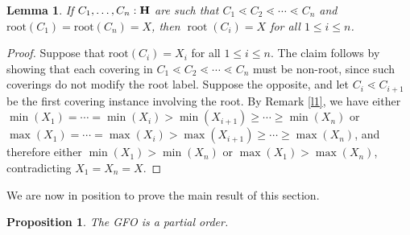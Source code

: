 \documentclass{article}
\theoremstyle{plain}
\newtheorem{lemma}[thm]{Lemma}
\newtheorem{prop}[thm]{Proposition}
\theoremstyle{definition}
\begin{document}
\begin{lemma}\label{l2}
If $C_1,\dots,C_n:{\bf H}$ are such that $C_1 \lessdot C_2 \lessdot \cdots \lessdot C_n$ and $\textrm{root}(C_1)=\textrm{root}(C_n)=X$,
 then $\operatorname{root}(C_i)=X$ for all $1\leq i\leq n$.
\end{lemma}
\begin{proof}
Suppose that $\textrm{root}(C_i)=X_i$ for all $1\leq i\leq n$. The claim follows by showing that each covering in $C_1 \lessdot C_2 \lessdot \cdots \lessdot C_n$ must be non-root, since such coverings do not modify the root label. Suppose the opposite, and let $C_i\lessdot C_{i+1}$ be the first covering instance involving the root. By Remark \ref{l1}, we have either $\min(X_1)=\cdots =\min(X_i)>\min(X_{i+1})\geq \cdots\geq\min(X_n)$ or
 $\max(X_1)=\cdots =\max(X_i)>\max(X_{i+1})\geq \cdots\geq\max(X_n)$, and therefore either
 $\min(X_1)>\min(X_n)$ or $\max(X_1)>\max(X_n)$, contradicting $X_1=X_n=X$.
\end{proof}

We are now in position to prove the main result of this section. 

\begin{prop} \label{lessdot-order}
 The GFO is a partial order.
\end{prop} 
\end{document}
